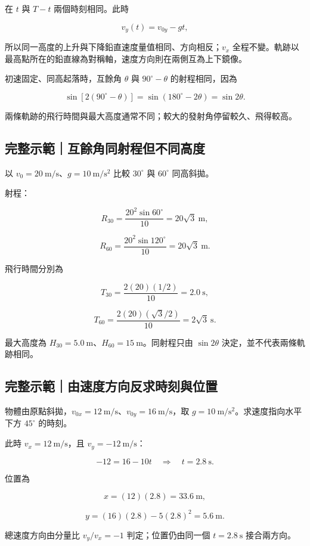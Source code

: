 \documentclass[11pt,a4paper]{article}
\begin{document}
在 \(t\) 與 \(T-t\) 兩個時刻相同。此時

\[
v_y(t)=v_{0y}-gt,
\]

所以同一高度的上升與下降鉛直速度量值相同、方向相反；\(v_x\) 全程不變。軌跡以最高點所在的鉛直線為對稱軸，速度方向則在兩側互為上下鏡像。

初速固定、同高起落時，互餘角 \(\theta\) 與 \(90^\circ-\theta\) 的射程相同，因為

\[
\sin[2(90^\circ-\theta)]=\sin(180^\circ-2\theta)=\sin2\theta.
\]

兩條軌跡的飛行時間與最大高度通常不同；較大的發射角停留較久、飛得較高。

\begin{HandoutWorkedExample}

\subsection{完整示範｜互餘角同射程但不同高度}\label{ux5b8cux6574ux793aux7bc4ux4e92ux9918ux89d2ux540cux5c04ux7a0bux4f46ux4e0dux540cux9ad8ux5ea6}

以 \(v_0=20\ \mathrm{m/s}\)、\(g=10\ \mathrm{m/s^2}\) 比較 \(30^\circ\) 與 \(60^\circ\) 同高斜拋。

射程：

\[
R_{30}=\frac{20^2\sin60^\circ}{10}=20\sqrt3\ \mathrm m,
\]

\[
R_{60}=\frac{20^2\sin120^\circ}{10}=20\sqrt3\ \mathrm m.
\]

飛行時間分別為

\[
T_{30}=\frac{2(20)(1/2)}{10}=2.0\ \mathrm s,
\]

\[
T_{60}=\frac{2(20)(\sqrt3/2)}{10}=2\sqrt3\ \mathrm s.
\]

最大高度為 \(H_{30}=5.0\ \mathrm m\)、\(H_{60}=15\ \mathrm m\)。同射程只由 \(\sin2\theta\) 決定，並不代表兩條軌跡相同。

\end{HandoutWorkedExample}

\begin{HandoutWorkedExample}

\subsection{完整示範｜由速度方向反求時刻與位置}\label{ux5b8cux6574ux793aux7bc4ux7531ux901fux5ea6ux65b9ux5411ux53cdux6c42ux6642ux523bux8207ux4f4dux7f6e}

物體由原點斜拋，\(v_{0x}=12\ \mathrm{m/s}\)、\(v_{0y}=16\ \mathrm{m/s}\)，取 \(g=10\ \mathrm{m/s^2}\)。求速度指向水平下方 \(45^\circ\) 的時刻。

此時 \(v_x=12\ \mathrm{m/s}\)，且 \(v_y=-12\ \mathrm{m/s}\)：

\[
-12=16-10t\quad\Rightarrow\quad t=2.8\ \mathrm s.
\]

位置為

\[
x=(12)(2.8)=33.6\ \mathrm m,
\]

\[
y=(16)(2.8)-5(2.8)^2=5.6\ \mathrm m.
\]

總速度方向由分量比 \(v_y/v_x=-1\) 判定；位置仍由同一個 \(t=2.8\ \mathrm s\) 接合兩方向。

\end{HandoutWorkedExample}
\end{document}
